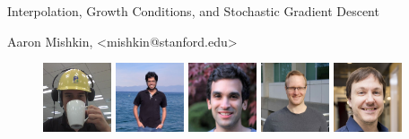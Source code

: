 \documentclass[mathserif,notheorems, hyperref={colorlinks, citecolor=blue, urlcolor=blue, linkcolor=blue}]{beamer}
\title{}
\author{}
\institute{}
\date{}
\def\\{}%
\def\texttt#1{<#1>}%
\begin{document}
\begin{frame}
	\vspace{1em}
	\begin{center}
		{\Large Interpolation, Growth Conditions, and Stochastic Gradient Descent  \vspace{1em}} %

		{\large Aaron Mishkin, \\ \texttt{mishkin@stanford.edu} } %
	\end{center}

	\vspace{1ex}

	\begin{figure}
		\centering
		\includegraphics[width=0.18\textwidth]{collaborators/fred}
		\includegraphics[width=0.18\textwidth]{collaborators/sharan}
		\includegraphics[width=0.18\textwidth]{collaborators/issam}
		\includegraphics[width=0.18\textwidth]{collaborators/mark}
		\includegraphics[width=0.18\textwidth]{collaborators/simon}
	\end{figure}
\end{frame}
\end{document}
